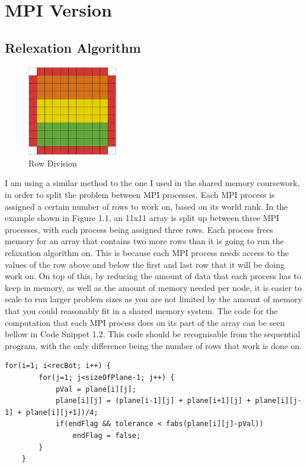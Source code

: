 \documentclass{report}
\begin{document}
\section{MPI Version}
\subsection{Relexation Algorithm}
\begin{figure}
\vspace{-30pt}
\includegraphics[width=0.35\textwidth]{grid}
\caption{Row Division}
\label{fig:subim1}
\end{figure}

I am using a similar method to the one I used in the shared memory coursework, in order to split the problem between MPI processes. Each MPI process is assigned a certain number of rows to work on, based on its world rank. In the example shown in Figure 1.1, an 11x11 array is split up between three MPI processes, with each process being assigned three rows. Each process frees memory for an array that contains two more rows than it is going to run the relaxation algorithm on. This is because each MPI process needs access to the values of the row above and below the first and last row that it will be doing work on. On top of this, by reducing the amount of data that each process has to keep in memory, as well as the amount of memory needed per node, it is easier to scale to run larger problem sizes as you are not limited by the amount of memory that you could reasonably fit in a shared memory system. The code for the computation that each MPI process does on its part of the array can be seen bellow in Code Snippet 1.2. This code should be recognisable from the sequential program, with the only difference being the number of rows that work is done on.

\begin{lstlisting}[style=customc,caption=MPI Relaxation Computation]
    for(i=1; i<recBot; i++) {
        for(j=1; j<sizeOfPlane-1; j++) {
            pVal = plane[i][j];
            plane[i][j] = (plane[i-1][j] + plane[i+1][j] + plane[i][j-1] + plane[i][j+1])/4;
            if(endFlag && tolerance < fabs(plane[i][j]-pVal))
                endFlag = false;
        }
    }
\end{lstlisting}
\end{document}
